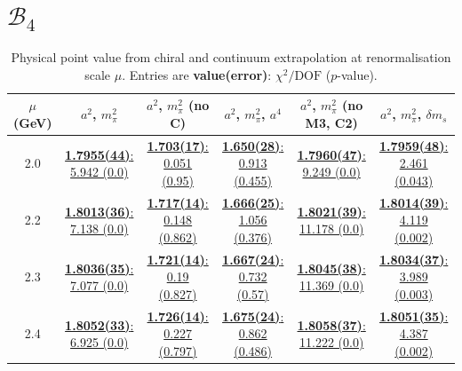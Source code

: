 \documentclass[12pt]{extarticle}
\begin{document}
\section{$\mathcal{B}_4$}
\begin{table}[h!]
\begin{center}
\begin{tabular}{|c|c|c|c|c|c|}
\hline
$\mu$ (GeV) & $a^2$, $m_\pi^2$& $a^2$, $m_\pi^2$ (no C)& $a^2$, $m_\pi^2$, $a^4$& $a^2$, $m_\pi^2$ (no M3, C2)& $a^2$, $m_\pi^2$, $\delta m_s$\\
\hline
2.0& \hyperlink{SSpPP/SUSY/bag_a2m2_20.pdf.1}{\textbf{1.7955(44)}: 5.942 (0.0)} & \hyperlink{SSpPP/SUSY/bag_a2m2noC_20.pdf.1}{\textbf{1.703(17)}: 0.051 (0.95)} & \hyperlink{SSpPP/SUSY/bag_a2a4m2_20.pdf.1}{\textbf{1.650(28)}: 0.913 (0.455)} & \hyperlink{SSpPP/SUSY/bag_a2m2mcut_20.pdf.1}{\textbf{1.7960(47)}: 9.249 (0.0)} & \hyperlink{SSpPP/SUSY/bag_a2m2delm_20.pdf.1}{\textbf{1.7959(48)}: 2.461 (0.043)}\\
2.2& \hyperlink{SSpPP/SUSY/bag_a2m2_22.pdf.1}{\textbf{1.8013(36)}: 7.138 (0.0)} & \hyperlink{SSpPP/SUSY/bag_a2m2noC_22.pdf.1}{\textbf{1.717(14)}: 0.148 (0.862)} & \hyperlink{SSpPP/SUSY/bag_a2a4m2_22.pdf.1}{\textbf{1.666(25)}: 1.056 (0.376)} & \hyperlink{SSpPP/SUSY/bag_a2m2mcut_22.pdf.1}{\textbf{1.8021(39)}: 11.178 (0.0)} & \hyperlink{SSpPP/SUSY/bag_a2m2delm_22.pdf.1}{\textbf{1.8014(39)}: 4.119 (0.002)}\\
2.3& \hyperlink{SSpPP/SUSY/bag_a2m2_23.pdf.1}{\textbf{1.8036(35)}: 7.077 (0.0)} & \hyperlink{SSpPP/SUSY/bag_a2m2noC_23.pdf.1}{\textbf{1.721(14)}: 0.19 (0.827)} & \hyperlink{SSpPP/SUSY/bag_a2a4m2_23.pdf.1}{\textbf{1.667(24)}: 0.732 (0.57)} & \hyperlink{SSpPP/SUSY/bag_a2m2mcut_23.pdf.1}{\textbf{1.8045(38)}: 11.369 (0.0)} & \hyperlink{SSpPP/SUSY/bag_a2m2delm_23.pdf.1}{\textbf{1.8034(37)}: 3.989 (0.003)}\\
2.4& \hyperlink{SSpPP/SUSY/bag_a2m2_24.pdf.1}{\textbf{1.8052(33)}: 6.925 (0.0)} & \hyperlink{SSpPP/SUSY/bag_a2m2noC_24.pdf.1}{\textbf{1.726(14)}: 0.227 (0.797)} & \hyperlink{SSpPP/SUSY/bag_a2a4m2_24.pdf.1}{\textbf{1.675(24)}: 0.862 (0.486)} & \hyperlink{SSpPP/SUSY/bag_a2m2mcut_24.pdf.1}{\textbf{1.8058(37)}: 11.222 (0.0)} & \hyperlink{SSpPP/SUSY/bag_a2m2delm_24.pdf.1}{\textbf{1.8051(35)}: 4.387 (0.002)}\\
\hline
\end{tabular}
\caption{Physical point value from chiral and continuum extrapolation at renormalisation scale $\mu$. Entries are \textbf{value(error)}: $\chi^2/\text{DOF}$ ($p$-value).}
\end{center}
\end{table}
\end{document}
